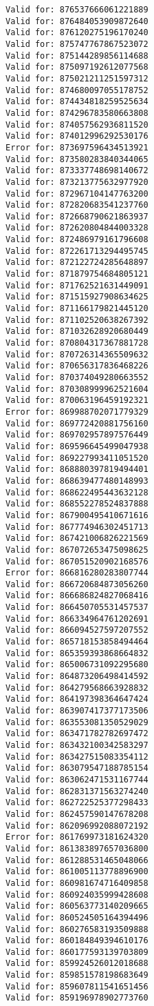 \documentclass[11pt]{article}
\begin{document}
\begin{Verbatim}[commandchars=\\\{\}]
Valid for: 876537666061221889
Valid for: 876484053909872640
Valid for: 876120275196170240
Valid for: 875747767867523072
Valid for: 875144289856114688
Valid for: 875097192612077568
Valid for: 875021211251597312
Valid for: 874680097055178752
Valid for: 874434818259525634
Valid for: 874296783580663808
Valid for: 874057562936811520
Valid for: 874012996292530176
Error for: 873697596434513921
Valid for: 873580283840344065
Valid for: 873337748698140672
Valid for: 873213775632977920
Valid for: 872967104147763200
Valid for: 872820683541237760
Valid for: 872668790621863937
Valid for: 872620804844003328
Valid for: 872486979161796608
Valid for: 872261713294495745
Valid for: 872122724285648897
Valid for: 871879754684805121
Valid for: 871762521631449091
Valid for: 871515927908634625
Valid for: 871166179821445120
Valid for: 871102520638267392
Valid for: 871032628920680449
Valid for: 870804317367881728
Valid for: 870726314365509632
Valid for: 870656317836468226
Valid for: 870374049280663552
Valid for: 870308999962521604
Valid for: 870063196459192321
Error for: 869988702071779329
Valid for: 869772420881756160
Valid for: 869702957897576449
Valid for: 869596645499047938
Valid for: 869227993411051520
Valid for: 868880397819494401
Valid for: 868639477480148993
Valid for: 868622495443632128
Valid for: 868552278524837888
Valid for: 867900495410671616
Valid for: 867774946302451713
Valid for: 867421006826221569
Valid for: 867072653475098625
Valid for: 867051520902168576
Error for: 866816280283807744
Valid for: 866720684873056260
Valid for: 866686824827068416
Valid for: 866450705531457537
Valid for: 866334964761202691
Valid for: 866094527597207552
Valid for: 865718153858494464
Valid for: 865359393868664832
Valid for: 865006731092295680
Valid for: 864873206498414592
Valid for: 864279568663928832
Valid for: 864197398364647424
Valid for: 863907417377173506
Valid for: 863553081350529029
Valid for: 863471782782697472
Valid for: 863432100342583297
Valid for: 863427515083354112
Valid for: 863079547188785154
Valid for: 863062471531167744
Valid for: 862831371563274240
Valid for: 862722525377298433
Valid for: 862457590147678208
Valid for: 862096992088072192
Error for: 861769973181624320
Valid for: 861383897657036800
Valid for: 861288531465048066
Valid for: 861005113778896900
Valid for: 860981674716409858
Valid for: 860924035999428608
Valid for: 860563773140209665
Valid for: 860524505164394496
Valid for: 860276583193509888
Valid for: 860184849394610176
Valid for: 860177593139703809
Valid for: 859924526012018688
Valid for: 859851578198683649
Valid for: 859607811541651456
Valid for: 859196978902773760

\end{Verbatim}
\end{document}

